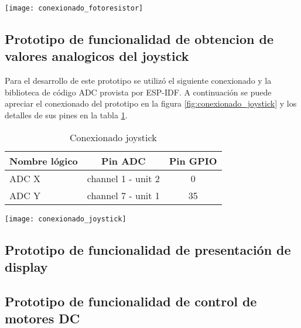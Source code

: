 \vspace{0.5cm}
\begin{center}
  \texttt{[image: conexionado\_fotoresistor]}
    \label{fig:conexionado_fotoresistor}
    
\end{center}
\subsection{Prototipo de funcionalidad de obtencion de valores analogicos del joystick}
Para el desarrollo de este prototipo se utilizó el siguiente conexionado y la biblioteca de código ADC provista por ESP-IDF. A continuación se puede apreciar el conexionado del prototipo en la figura \ref{fig:conexionado_joystick} y los detalles de sus pines en la tabla \ref{tab:conexionado_joystick}.


\vspace{0.5cm}
\begin{table}[h]
\centering
\caption[Conexionado joystick]{Conexionado joystick}
\begin{tabular}{l c c}
\toprule
\textbf{Nombre lógico} & \textbf{Pin ADC} & \textbf{Pin GPIO}\\
\midrule
ADC X & channel 1 - unit 2 & 0 \\
ADC Y & channel 7 - unit 1 & 35 \\
\bottomrule
\hline
\end{tabular}
\label{tab:conexionado_joystick}
\end{table}

\vspace{0.5cm}

\begin{center}
  \texttt{[image: conexionado\_joystick]}
    \label{fig:conexionado_joystick}
    

\end{center}

\subsection{Prototipo de funcionalidad de presentación de display}
 

\subsection{Prototipo de funcionalidad de control de motores DC}


